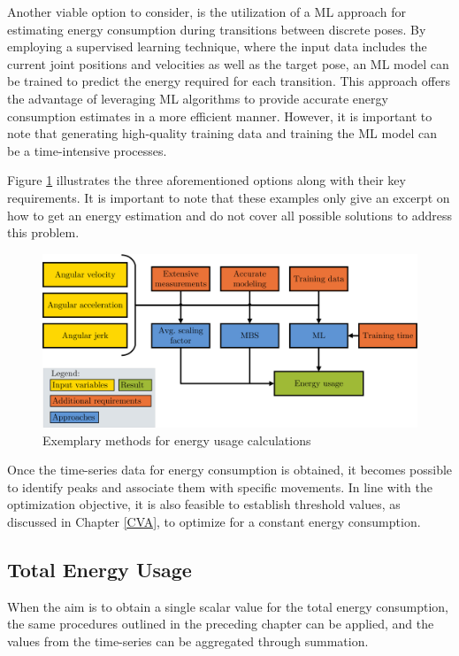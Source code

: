 Another viable option to consider, is the utilization of a \acrshort{ML} approach for estimating energy consumption during transitions between discrete poses. By employing a supervised learning technique, where the input data includes the current joint positions and velocities as well as the target pose, an \acrshort{ML} model can be trained to predict the energy required for each transition. This approach offers the advantage of leveraging \acrshort{ML} algorithms to provide accurate energy consumption estimates in a more efficient manner. However, it is important to note that generating high-quality training data and training the \acrshort{ML} model can be a time-intensive processes.

Figure \ref{ENERGYOPTIONS} illustrates the three aforementioned options along with their key requirements. It is important to note that these examples only give an excerpt on how to get an energy estimation and do not cover all possible solutions to address this problem. 

\begin{figure}[H]
	\centerline{\includegraphics[width=1\textwidth]{figures/ENERGYOPTIONS.png}}
	\caption{Exemplary methods for energy usage calculations}
	\label{ENERGYOPTIONS}
\end{figure}
\newpage
Once the time-series data for energy consumption is obtained, it becomes possible to identify peaks and associate them with specific movements. In line with the optimization objective, it is also feasible to establish threshold values, as discussed in Chapter \ref{CVA}, to optimize for a constant energy consumption.


\subsection{Total Energy Usage}
When the aim is to obtain a single scalar value for the total energy consumption, the same procedures outlined in the preceding chapter can be applied, and the values from the time-series can be aggregated through summation.


